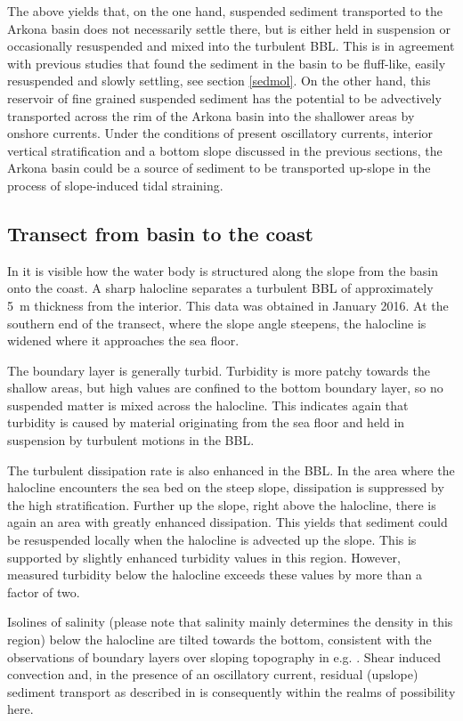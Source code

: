 The above yields that, on the one hand, suspended sediment transported to the 
Arkona basin does not necessarily settle there, but is either held in 
suspension or occasionally resuspended and mixed into the turbulent BBL. This 
is in agreement with previous studies that found the sediment in the basin to 
be fluff-like, easily resuspended and slowly settling, see section 
\ref{sedmol}. On the other hand, this reservoir of fine grained 
suspended sediment has the potential to be advectively 
transported across the rim of the Arkona basin into the shallower areas by 
onshore currents. Under the conditions of present oscillatory currents, 
interior vertical stratification and a bottom slope discussed in the previous 
sections, the Arkona basin could be a source of sediment to be transported 
up-slope in the process of slope-induced tidal straining.

\subsection{Transect from basin to the coast}

In  it is visible how the water body is structured along the 
slope from the basin onto the coast. A sharp halocline separates a turbulent 
BBL of approximately 5~m thickness from the interior. This 
data was obtained in January 2016. At the southern end of the transect, where 
the slope angle steepens, the halocline is widened where it approaches the sea 
floor. 

The boundary layer is generally turbid. Turbidity is more patchy towards the 
shallow areas, but high values are confined to the bottom boundary layer, 
so no suspended matter is mixed across the halocline. This indicates again that 
turbidity is caused by material originating from the sea floor and held in 
suspension by turbulent motions in the BBL.

The turbulent dissipation rate is also enhanced in the BBL. In the area where 
the halocline encounters the sea bed on the steep slope, dissipation is 
suppressed by the high stratification. Further up the slope, right above the 
halocline, there is again an area with greatly enhanced dissipation. This 
yields that sediment could be resuspended locally when the halocline is 
advected up the slope. This is supported by slightly enhanced turbidity values 
in this region. However, measured turbidity below the halocline exceeds these 
values by more than a factor of two.

Isolines of salinity (please note that salinity mainly determines the density 
in this region) below the halocline are tilted towards the bottom, consistent 
with the observations of boundary layers over sloping topography in e.g. 
\cite{Lorkeetal2005a}. Shear induced convection and, in the presence of an 
oscillatory current, residual (upslope) sediment transport as described in 
\cite{schulzumlauf2016} is consequently within the realms of possibility here.

